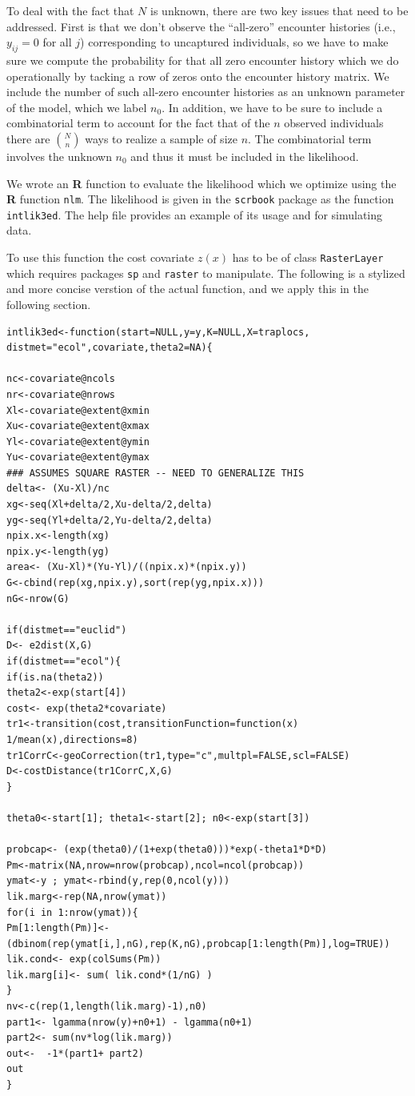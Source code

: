 To deal with the fact that $N$ is unknown, there are two key issues
that need to be addressed.  First is that we don't observe the
``all-zero'' encounter histories (i.e., $y_{ij} = 0$ for all $j$)
corresponding to uncaptured individuals, so we have to make sure we
compute the probability for that all zero encounter history which we
do operationally by tacking a row of zeros onto the encounter history
matrix. We include the number of such all-zero encounter histories as
an unknown parameter of the model, which we label $n_{0}$.  In
addition, we have to be sure to include a combinatorial term to
account for the fact that of the $n$ observed individuals there are
${N \choose n}$ ways to realize a sample of size $n$. The
combinatorial term involves the unknown $n_{0}$ and thus it must be
included in the likelihood.

We wrote an {\bf R} function to evaluate the likelihood which we optimize
using the {\bf R} function \mbox{\tt nlm}.
The likelihood is given in the {\tt scrbook} package as the function
\mbox{\tt intlik3ed}. The help file 
provides an example of its usage and for simulating data.

To use this function the cost covariate $z(x)$ has to be of class 
\mbox{\tt RasterLayer} which requires packages \mbox{\tt sp} and
\mbox{\tt raster} to manipulate. 
The following is a stylized and more concise verstion of the actual
function, and we apply this in the following section.

{\small
\begin{verbatim}
intlik3ed<-function(start=NULL,y=y,K=NULL,X=traplocs,
distmet="ecol",covariate,theta2=NA){

nc<-covariate@ncols
nr<-covariate@nrows
Xl<-covariate@extent@xmin
Xu<-covariate@extent@xmax
Yl<-covariate@extent@ymin
Yu<-covariate@extent@ymax
### ASSUMES SQUARE RASTER -- NEED TO GENERALIZE THIS
delta<- (Xu-Xl)/nc
xg<-seq(Xl+delta/2,Xu-delta/2,delta) 
yg<-seq(Yl+delta/2,Yu-delta/2,delta) 
npix.x<-length(xg)
npix.y<-length(yg)
area<- (Xu-Xl)*(Yu-Yl)/((npix.x)*(npix.y))
G<-cbind(rep(xg,npix.y),sort(rep(yg,npix.x)))
nG<-nrow(G)

if(distmet=="euclid")
D<- e2dist(X,G)  
if(distmet=="ecol"){
if(is.na(theta2))
theta2<-exp(start[4])
cost<- exp(theta2*covariate)
tr1<-transition(cost,transitionFunction=function(x) 1/mean(x),directions=8)
tr1CorrC<-geoCorrection(tr1,type="c",multpl=FALSE,scl=FALSE)
D<-costDistance(tr1CorrC,X,G)
}

theta0<-start[1]; theta1<-start[2]; n0<-exp(start[3])

probcap<- (exp(theta0)/(1+exp(theta0)))*exp(-theta1*D*D)
Pm<-matrix(NA,nrow=nrow(probcap),ncol=ncol(probcap))
ymat<-y ; ymat<-rbind(y,rep(0,ncol(y)))
lik.marg<-rep(NA,nrow(ymat))
for(i in 1:nrow(ymat)){
Pm[1:length(Pm)]<- (dbinom(rep(ymat[i,],nG),rep(K,nG),probcap[1:length(Pm)],log=TRUE))
lik.cond<- exp(colSums(Pm))
lik.marg[i]<- sum( lik.cond*(1/nG) )  
}                                                 
nv<-c(rep(1,length(lik.marg)-1),n0)
part1<- lgamma(nrow(y)+n0+1) - lgamma(n0+1)
part2<- sum(nv*log(lik.marg))
out<-  -1*(part1+ part2)
out
}
\end{verbatim}
}

